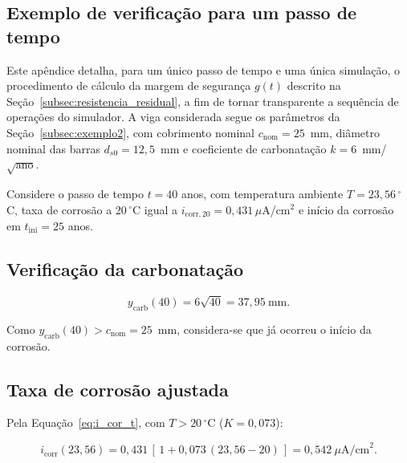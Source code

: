 \begin{appendices}
\iffalse
\section{Exemplo de verifica\c{c}\~ao para um passo de tempo}
\label{app:exemplo_passo}


Este apêndice detalha, para um único passo de tempo e uma única simulação, o procedimento de cálculo da margem de segurança $g(t)$ descrito na Seção~\ref{subsec:resistencia_residual}, a fim de tornar transparente a sequência de operações do simulador. A viga considerada segue os parâmetros da Seção~\ref{subsec:exemplo2}, com cobrimento nominal $c_{\mathrm{nom}} = 25$~mm, diâmetro nominal das barras $d_{s0} = 12{,}5$~mm e coeficiente de carbonatação $k = 6$~mm/$\sqrt{\text{ano}}$.

Considere o passo de tempo $t = 40$ anos, com temperatura ambiente $T = 23{,}56\,^\circ$C, taxa de corrosão a 20\,$^\circ$C igual a $i_{\mathrm{corr},20} = 0{,}431\,\mu$A/cm$^2$ e início da corrosão em $t_{\mathrm{ini}} = 25$ anos.

\subsection{Verifica\c{c}\~ao da carbonata\c{c}\~ao}

\begin{equation}
y_{\mathrm{carb}}(40) = 6\sqrt{40} = 37{,}95~\text{mm}.
\end{equation}

Como $y_{\mathrm{carb}}(40) > c_{\mathrm{nom}} = 25$~mm, considera-se que já ocorreu o início da corrosão.

\subsection{Taxa de corros\~ao ajustada}

Pela Equação~\eqref{eq:i_cor_t}, com $T > 20\,^\circ$C ($K = 0{,}073$):

\begin{equation}
i_{\mathrm{corr}}(23{,}56) = 0{,}431\,\left[\,1 + 0{,}073\,(23{,}56 - 20)\,\right] = 0{,}542~\mu\text{A/cm}^2.
\end{equation}


\end{appendices}
